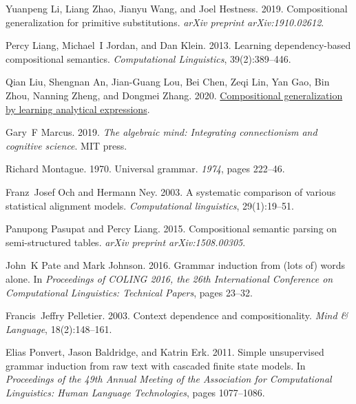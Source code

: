 \documentclass[11pt,a4paper]{article}
\begin{document}
\begin{thebibliography}{57}
Yuanpeng Li, Liang Zhao, Jianyu Wang, and Joel Hestness. 2019.
\newblock Compositional generalization for primitive substitutions.
\newblock \emph{arXiv preprint arXiv:1910.02612}.

Percy Liang, Michael~I Jordan, and Dan Klein. 2013.
\newblock Learning dependency-based compositional semantics.
\newblock \emph{Computational Linguistics}, 39(2):389--446.

Qian Liu, Shengnan An, Jian-Guang Lou, Bei Chen, Zeqi Lin, Yan Gao, Bin Zhou,
  Nanning Zheng, and Dongmei Zhang. 2020.
\newblock \href {http://arxiv.org/abs/2006.10627} {Compositional generalization
  by learning analytical expressions}.

Gary~F Marcus. 2019.
\newblock \emph{The algebraic mind: Integrating connectionism and cognitive
  science}.
\newblock MIT press.

Richard Montague. 1970.
\newblock Universal grammar.
\newblock \emph{1974}, pages 222--46.

Franz~Josef Och and Hermann Ney. 2003.
\newblock A systematic comparison of various statistical alignment models.
\newblock \emph{Computational linguistics}, 29(1):19--51.

Panupong Pasupat and Percy Liang. 2015.
\newblock Compositional semantic parsing on semi-structured tables.
\newblock \emph{arXiv preprint arXiv:1508.00305}.

John~K Pate and Mark Johnson. 2016.
\newblock Grammar induction from (lots of) words alone.
\newblock In \emph{Proceedings of COLING 2016, the 26th International
  Conference on Computational Linguistics: Technical Papers}, pages 23--32.

Francis~Jeffry Pelletier. 2003.
\newblock Context dependence and compositionality.
\newblock \emph{Mind \& Language}, 18(2):148--161.

Elias Ponvert, Jason Baldridge, and Katrin Erk. 2011.
\newblock Simple unsupervised grammar induction from raw text with cascaded
  finite state models.
\newblock In \emph{Proceedings of the 49th Annual Meeting of the Association
  for Computational Linguistics: Human Language Technologies}, pages
  1077--1086.


\end{thebibliography}
\end{document}
